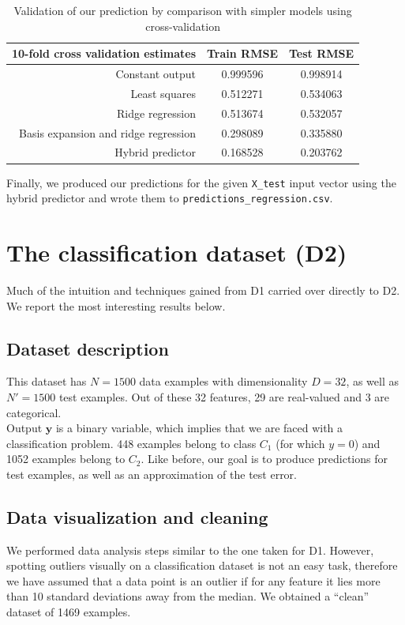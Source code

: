 \documentclass{article} %
\begin{document}
  \begin{table}[ht]
    \center
    \begin{tabular}{|r|c|c|}
      \hline
      \textbf{10-fold cross validation estimates} & Train RMSE & Test RMSE \\
      \hline
      Constant output                             & 0.999596   & 0.998914  \\
      \hline
      Least squares                               & 0.512271   & 0.534063  \\
      \hline
      Ridge regression                            & 0.513674   & 0.532057  \\
      \hline
      Basis expansion and ridge regression        & 0.298089   & 0.335880  \\
      \hline
      Hybrid predictor                            & 0.168528   & 0.203762  \\
      \hline
    \end{tabular}
    \caption{Validation of our prediction by comparison with simpler models using cross-validation}
    \label{predictor-validation}
  \end{table}

  Finally, we produced our predictions for the given \texttt{X\_test} input vector using the hybrid predictor and wrote them to \texttt{predictions\_regression.csv}.

\section{The classification dataset (D2)}
  Much of the intuition and techniques gained from D1 carried over directly to D2. We report the most interesting results below.

  \subsection{Dataset description}
  This dataset has $N = 1500$ data examples with dimensionality $D = 32$, as well as $N' = 1500$ test examples. Out of these 32 features, 29 are real-valued and 3 are categorical.\\
  Output $\mathbf{y}$ is a binary variable, which implies that we are faced with a classification problem. 448 examples belong to class $C_1$ (for which $y = 0$) and 1052 examples belong to $C_2$. Like before, our goal is to produce predictions for test examples, as well as an approximation of the test error.

  \subsection{Data visualization and cleaning}
  We performed data analysis steps similar to the one taken for D1. However, spotting outliers visually on a classification dataset is not an easy task, therefore we have assumed that a data point is an outlier if for any feature it lies more than 10 standard deviations away from the median. We obtained a ``clean'' dataset of 1469 examples.
\end{document}
